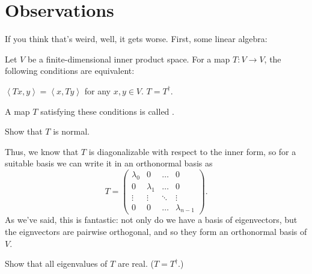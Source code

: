 \documentclass[11pt]{scrreprt}
\begin{document}
\section{Observations}
If you think that's weird, well, it gets worse.
First, some linear algebra:
\begin{definition}
	Let $V$ be a finite-dimensional inner product space.
	For a map $T: V \to V$, the following conditions are equivalent:
	\begin{itemize}
		\ii $\left< Tx, y\right> = \left< x, Ty \right>$
		for any $x,y \in V$.
		\ii $T = T^\dagger$.
	\end{itemize}
	A map $T$ satisfying these conditions is called .
\end{definition}
\begin{ques}
	Show that $T$ is normal.
\end{ques}
Thus, we know that $T$ is diagonalizable
with respect to the inner form, so for a suitable basis we
can write it in an orthonormal basis as
\[
	T = \begin{pmatrix}
		\lambda_0 & 0 & \dots & 0 \\
		0 & \lambda_1 & \dots & 0 \\
		\vdots & \vdots & \ddots & \vdots \\
		0 & 0 & \dots & \lambda_{n-1}
	\end{pmatrix}.
\]
As we've said, this is fantastic:
not only do we have a basis of eigenvectors,
but the eignvectors are pairwise orthogonal,
and so they form an orthonormal basis of $V$.
\begin{ques}
	Show that all eigenvalues of $T$ are real.
	($T = T^\dagger$.)
\end{ques}
\end{document}
